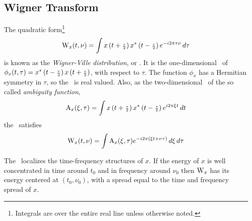 \subsection{Wigner Transform}
\label{sec:wigner}
The quadratic form\footnote{Integrals are over the entire real line unless
  otherwise noted.}
\begin{equation*} %
\W_x(t,\nu) = 
\int \xtpull \xtpushconj e^{-i2\pi \tau\nu}\,d\tau
\end{equation*}
is known as the \emph{Wigner-Ville distribution}, or \emph{\WT}.
It is the one-dimensional \FT\ of
$\phi_x(t,\tau) = x^*\left(t-{\scriptstyle \frac{\tau}{2}}\right) x\left(t+{\scriptstyle \frac{\tau}{2}}\right)$, with respect to $\tau$.
The function $\phi_x$ has a Hermitian symmetry in $\tau$, so the 
\WT\ is real valued. 
Also, as the two-dimensional \FT\ of the so called \emph{ambiguity function},  
\[
\operatorname{A}_{x}(\xi,\tau) = \int x\left(t+{\scriptstyle \frac{\tau}{2}}\right) x^*\left(t-{\scriptstyle \frac{\tau}{2}}\right) e^{i2\pi \xi t}\,dt
\]
the \WT\ satisfies
\begin{equation}\label{eq:ambig-ft}
\W_x(t,\nu) = %
\int \A_x(\xi,\tau) e^{-i2\pi(\xi t + \nu\tau)}\,d\xi\,d\tau
\end{equation}

The \WT\ localizes the time-frequency structures of $x$.  If
the energy of $x$ is well concentrated in time around $t_0$ and in
frequency around $\nu_0$ then $\operatorname{W}_x$ has its energy centered at
$(t_0,\nu_0)$, with a spread equal to the time and frequency spread of
$x$. 

